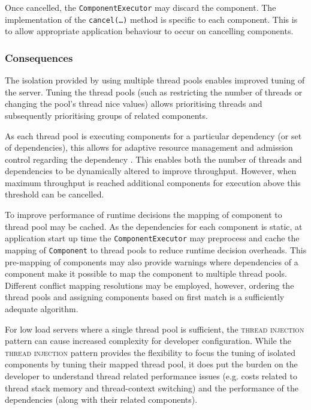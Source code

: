 \documentclass[prodmode]{style/acmlarge}
\begin{document}
Once cancelled, the \texttt{ComponentExecutor} may discard the component.  The
implementation of the \texttt{can\-cel(\ldots)} method is specific to each
component.  This is to allow appropriate application behaviour to occur on
cancelling components.


\subsubsection*{Consequences}

The isolation provided by using multiple thread pools enables improved tuning of
the server.  Tuning the thread pools (such as restricting the number of threads
or changing the pool's thread nice values) allows prioritising threads and
subsequently prioritising groups of related components.

As each thread pool is executing components for a particular dependency (or set
of dependencies), this allows for adaptive resource management and admission
control regarding the dependency \cite{seda}.  This enables both the number of
threads and dependencies to be dynamically altered to improve throughput.
However, when maximum throughput is reached additional components for execution
above this threshold can be cancelled.

To improve performance of runtime decisions the mapping of component to thread
pool may be cached.  As the dependencies for each component is static, at
application start up time the \texttt{ComponentExecutor} may preprocess and
cache the mapping of \texttt{Component} to thread pools to reduce runtime
decision overheads.  This pre-mapping of components may also provide warnings
where dependencies of a component make it possible to map the component to
multiple thread pools.  Different conflict mapping resolutions may be employed,
however, ordering the thread pools and assigning components based on first match
is a sufficiently adequate algorithm.

For low load servers where a single thread pool is sufficient, the
\textsc{thread injection} pattern can cause increased complexity for developer
configuration.  While the \textsc{thread injection} pattern provides the
flexibility to focus the tuning of isolated components by tuning their mapped
thread pool, it does put the burden on the developer to understand thread
related performance issues (e.g. costs related to thread stack memory and
thread-context switching) and the performance of the dependencies (along with
their related components).
\end{document}
